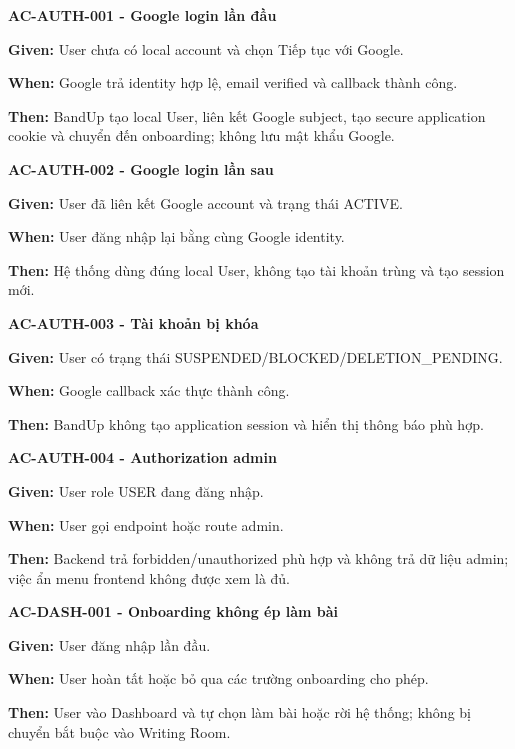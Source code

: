 \documentclass[11pt,a4paper]{article}
\begin{document}
\begin{acceptancebox}
\textbf{AC-AUTH-001 - Google login lần đầu}\par
\textbf{Given:} User chưa có local account và chọn Tiếp tục với Google.\par
\textbf{When:} Google trả identity hợp lệ, email verified và callback thành công.\par
\textbf{Then:} BandUp tạo local User, liên kết Google subject, tạo secure application cookie và chuyển đến onboarding; không lưu mật khẩu Google.
\end{acceptancebox}

\begin{acceptancebox}
\textbf{AC-AUTH-002 - Google login lần sau}\par
\textbf{Given:} User đã liên kết Google account và trạng thái ACTIVE.\par
\textbf{When:} User đăng nhập lại bằng cùng Google identity.\par
\textbf{Then:} Hệ thống dùng đúng local User, không tạo tài khoản trùng và tạo session mới.
\end{acceptancebox}

\begin{acceptancebox}
\textbf{AC-AUTH-003 - Tài khoản bị khóa}\par
\textbf{Given:} User có trạng thái SUSPENDED/\allowbreak{}BLOCKED/\allowbreak{}DELETION\_\allowbreak{}PENDING.\par
\textbf{When:} Google callback xác thực thành công.\par
\textbf{Then:} BandUp không tạo application session và hiển thị thông báo phù hợp.
\end{acceptancebox}

\begin{acceptancebox}
\textbf{AC-AUTH-004 - Authorization admin}\par
\textbf{Given:} User role USER đang đăng nhập.\par
\textbf{When:} User gọi endpoint hoặc route admin.\par
\textbf{Then:} Backend trả forbidden/\allowbreak{}unauthorized phù hợp và không trả dữ liệu admin; việc ẩn menu frontend không được xem là đủ.
\end{acceptancebox}

\begin{acceptancebox}
\textbf{AC-DASH-001 - Onboarding không ép làm bài}\par
\textbf{Given:} User đăng nhập lần đầu.\par
\textbf{When:} User hoàn tất hoặc bỏ qua các trường onboarding cho phép.\par
\textbf{Then:} User vào Dashboard và tự chọn làm bài hoặc rời hệ thống; không bị chuyển bắt buộc vào Writing Room.
\end{acceptancebox}
\end{document}
